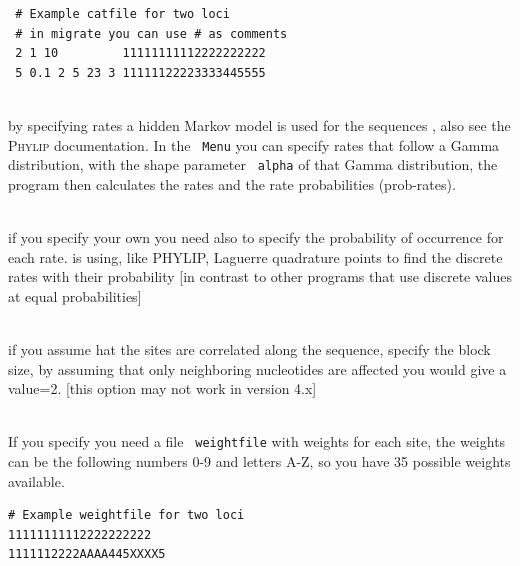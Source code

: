 \begin{description}
 \begin{small}
 \begin{verbatim}
 # Example catfile for two loci
 # in migrate you can use # as comments
 2 1 10         11111111112222222222
 5 0.1 2 5 23 3 11111122223333445555
\end{verbatim}
\end{small}
\item{}\\
by specifying rates  a hidden Markov model is used for the sequences \cite{felsenstein:1996:hmm}, also see the \textsc{ Phylip} documentation.
In the \texttt{ Menu} you can specify rates that follow
 a Gamma distribution,
with the shape parameter \texttt{ alpha} of that Gamma distribution,
the program then calculates the rates and the rate probabilities ({\bt prob-rates}). 
\item{}\\
if you specify your own {} you need also to specify 
the probability of occurrence for each rate. \migrate is using, like PHYLIP,  Laguerre quadrature points to find the discrete rates with their probability [in contrast to other programs that use discrete values at equal probabilities]

\item{}\\
if you assume hat the sites are correlated along the sequence, specify the block size, by assuming that only neighboring nucleotides are affected you would
give a value=2. [this option may not work in  version 4.x]

\item{}\\
If you specify {} you need a file \texttt{ weightfile} with weights for each
 site, the weights can be the following numbers 0-9 and letters A-Z,
 so you have 35 possible weights available.
 \begin{small}
 \begin{verbatim}
# Example weightfile for two loci
11111111112222222222
1111112222AAAA445XXXX5
\end{verbatim}
\end{small}


\end{description}
